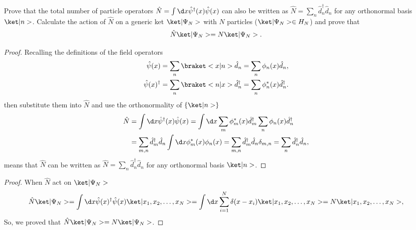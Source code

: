 \begin{problem}
  Prove that the total number of particle operators
  $\hat N = \int \d x \hat\psi^\dagger(x) \hat\psi(x)$
  can also be written as $\hat N = \sum_n \hat d_n^\dagger \hat d_n$
  for any orthonormal basis $\ket|n>$.
  Calculate the action of $\hat N$ on a generic ket $\ket|\Psi_N>$
  with $N$ particles ($\ket|\Psi_N> \in H_N$) and prove that
  \[
    \hat N \ket|\Psi_N> = N \ket|\Psi_N>.
  \]
\end{problem}
\begin{solution}
\begin{proof}
  Recalling the definitions of the field operators
  \begin{align*}
    \hat\psi(x) & = \sum_n \braket<x|n> \hat d_n = \sum_n \phi_n(x) \hat d_n,\\
    \hat\psi(x)^\dagger & = \sum_n \braket<n|x> \hat d_n^\dagger
  = \sum_n \phi_n^*(x) \hat d_n^\dagger.
  \end{align*}
  then substitute them into $\hat N$ and use the orthonormality of $\{\ket|n>\}$
  \begin{align*}
    \hat N & = \int \d x \hat\psi^\dagger(x) \hat\psi(x)
  = \int \d x \sum_m \phi_m^*(x) \hat d_m^\dagger
              \sum_n \phi_n(x) \hat d_n^\dagger\\
& = \sum_{m,n} \hat d_m^\dagger \hat d_n \int \d x \phi_m^*(x) \phi_n(x)
  = \sum_{m,n} \hat d_m^\dagger \hat d_n \delta_{m,n}
  = \sum_n \hat d_n^\dagger \hat d_n,
  \end{align*}
  means that $\hat N$ can be written as
  $\hat N = \sum_n \hat d_n^\dagger \hat d_n$
  for any orthonormal basis $\ket|n>$.
\end{proof}
\begin{proof}
  When $\hat N$ act on $\ket|\Psi_N>$
  \[
    \hat N \ket|\Psi_N>
  = \int \d x \hat\psi(x)^\dagger \hat\psi(x) \ket|x_1, x_2, \ldots,x_N>
  = \int \d x \sum_{i=1}^N \delta(x - x_i) \ket|x_1, x_2, \ldots,x_N>
  = N \ket|x_1, x_2, \ldots,x_N>,
  \]
  So, we proved that $\hat N \ket|\Psi_N> = N \ket|\Psi_N>$.
\end{proof}
\end{solution}


